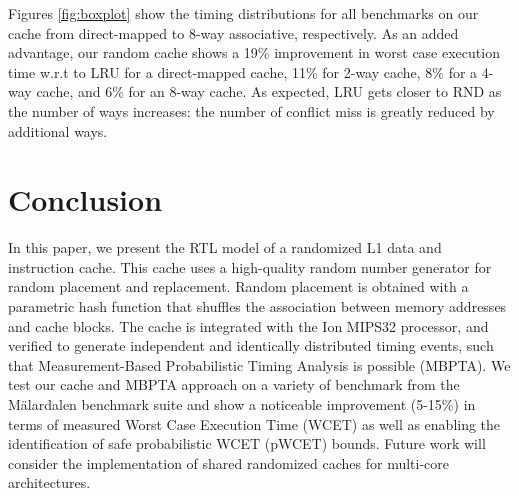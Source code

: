Figures \ref{fig:boxplot} show the timing
distributions for all benchmarks on our cache from direct-mapped to
8-way associative, respectively. As an added advantage, our random
cache shows a 19\% improvement in worst case execution time w.r.t to
LRU for a direct-mapped cache, 11\% for 2-way cache, 8\% for a 4-way
cache, and 6\% for an 8-way cache. As expected, LRU gets closer to RND
as the number of ways increases: the number of conflict miss is
greatly reduced by additional ways.

\section{Conclusion}
In this paper, we present the RTL model of a randomized L1 data and
instruction cache. This cache uses a high-quality random number
generator for random placement and replacement. Random placement is
obtained with a parametric hash function that shuffles the association
between memory addresses and cache blocks. The cache is integrated
with the Ion MIPS32 processor, and verified to generate independent
and identically distributed timing events, such that Measurement-Based
Probabilistic Timing Analysis is possible (MBPTA). We test our cache
and MBPTA approach on a variety of benchmark from the M\"alardalen
benchmark suite and show a noticeable improvement (5-15\%) in terms of
measured Worst Case Execution Time (WCET) as well as enabling the
identification of safe probabilistic WCET (pWCET) bounds.  Future work
will consider the implementation of shared randomized caches for
multi-core architectures.
